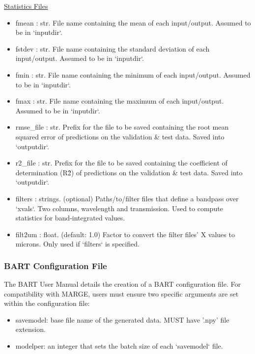 \documentclass[letterpaper, 12pt]{article}
\begin{document}
\noindent \underline{Statistics Files}
\begin{itemize}
\item fmean      : str.  File name containing the mean of each input/output.
                         Assumed to be in `inputdir`.
\item fstdev     : str.  File name containing the standard deviation of each 
                   input/output.
                         Assumed to be in `inputdir`.
\item fmin       : str.  File name containing the minimum of each input/output.
                         Assumed to be in `inputdir`.
\item fmax       : str.  File name containing the maximum of each input/output.
                         Assumed to be in `inputdir`.
\item rmse\_file  : str.  Prefix for the file to be saved containing the root mean 
                   squared error of predictions on the validation \& test data.
                   Saved into `outputdir`.
\item r2\_file    : str.  Prefix for the file to be saved containing the 
                   coefficient of determination (R\^2) of predictions on the 
                   validation \& test data.
                   Saved into `outputdir`.
\item filters : strings. (optional) Paths/to/filter files that define a 
                   bandpass over `xvals`. 
                   Two columns, wavelength and transmission.
                   Used to compute statistics for band-integrated values.
\item filt2um : float. (default: 1.0) Factor to convert the filter files' 
                       X values to microns. 
                       Only used if `filters` is specified.
\end{itemize}



\subsubsection{BART Configuration File}
\label{sec:BARTconfig}

The BART User Manual details the creation of a BART configuration file.  For 
compatibility with MARGE, users must ensure two specific arguments are set 
within the configuration file:
\begin{itemize}
\item savemodel: base file name of the generated data. MUST have '.npy' file 
                 extension.
\item modelper: an integer that sets the batch size of each `savemodel` file.
\end{itemize}
\end{document}
